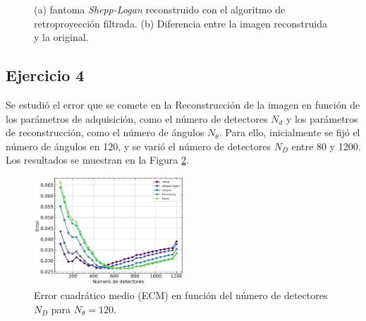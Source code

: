 \documentclass[11pt, twocolumn]{article}
\begin{document}
  \begin{figure}[H]
    \centering
    \hfill
    \hfill
    \caption{(a) fantoma \textit{Shepp-Logan} reconstruido con el algoritmo de retroproyección filtrada. (b) Diferencia entre la imagen reconstruida y la original.}
    \label{fig:figuras_ej_3}
  \end{figure}

\subsection*{Ejercicio 4}
Se estudió el error que se comete en la Reconstrucción de la imagen en función de los parámetros de adquisición, como el número de detectores $N_d$ y los parámetros de reconstrucción, como el número de ángulos $N_\theta$. Para ello, inicialmente se fijó el número de ángulos en 120, y se varió el número de detectores $N_D$ entre 80 y 1200. Los resultados se muestran en la Figura \ref{fig:error_escalas}.

\begin{figure} [htbp]
    \centering
    \includegraphics*[width=0.5\textwidth]{./images/ej_4/scale_error_2.png}
    \caption{Error cuadrático medio (ECM) en función del número de detectores $N_D$ para $N_\theta = 120$.}
    \label{fig:error_escalas}
\end{figure}
\end{document}
